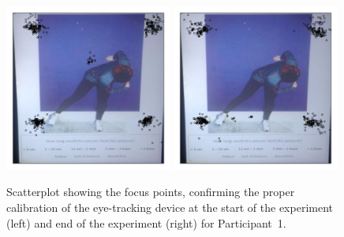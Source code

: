 \documentclass[11pt]{asaproc}
\begin{document}
\begin{figure}[t]
\begin{center} 
\includegraphics[width=0.49\textwidth]{figures/Kayd_scatterplot_posture0.jpg} \hspace{1pt}
\includegraphics[width=0.49\textwidth]{figures/Kayd_scatterplot_posture23.jpg}
\end{center}
\caption{\label{ScatterplotPrePost}Scatterplot showing the focus points, confirming the proper calibration of the eye-tracking device
at the start of the experiment (left) and end of the experiment (right) for Participant~1.}
\end{figure}
\end{document}
